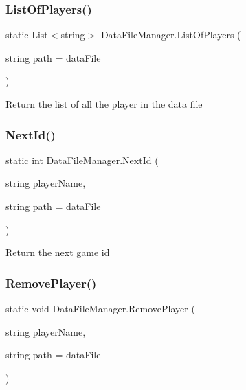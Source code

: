 \subsubsection{\texorpdfstring{List\+Of\+Players()}{ListOfPlayers()}}
{\footnotesize\ttfamily static List$<$string$>$ Data\+File\+Manager.\+List\+Of\+Players (\begin{DoxyParamCaption}\item[{string}]{path = {\ttfamily dataFile} }\end{DoxyParamCaption})\hspace{0.3cm}{\ttfamily [static]}}

Return the list of all the player in the data file \mbox{\label{class_data_file_manager_adb1a1aefda32170d551cc8103183a070}} 
\subsubsection{\texorpdfstring{Next\+Id()}{NextId()}}
{\footnotesize\ttfamily static int Data\+File\+Manager.\+Next\+Id (\begin{DoxyParamCaption}\item[{string}]{player\+Name,  }\item[{string}]{path = {\ttfamily dataFile} }\end{DoxyParamCaption})\hspace{0.3cm}{\ttfamily [static]}}

Return the next game id \mbox{\label{class_data_file_manager_a326a5c6038fcba1b949e825e7f67c9e7}} 
\subsubsection{\texorpdfstring{Remove\+Player()}{RemovePlayer()}}
{\footnotesize\ttfamily static void Data\+File\+Manager.\+Remove\+Player (\begin{DoxyParamCaption}\item[{string}]{player\+Name,  }\item[{string}]{path = {\ttfamily dataFile} }\end{DoxyParamCaption})\hspace{0.3cm}{\ttfamily [static]}}

